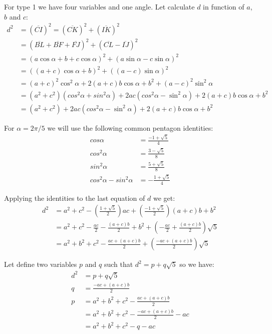 \documentclass[11pt]{article}
\begin{document}
For type 1 we have four variables and one angle. Let calculate $d$ in function of $a$, $b$ and $c$:
\begin{align}
d^2 &= (\overline{CI})^2 = (\overline{CK})^2 + (\overline{IK})^2\\
    &= (\overline{BL} + \overline{BF} + \overline{FJ})^2 + (\overline{CL} - \overline{IJ})^2 \nonumber\\
    &= (a\cos{\alpha} + b + c\cos{\alpha})^2 + (a\sin{\alpha} - c\sin{\alpha})^2 \nonumber\\
    &= ((a+c)\cos{\alpha} + b)^2 + ((a-c)\sin{\alpha})^2 \nonumber\\
    &= (a+c)^2\cos^2{\alpha} + 2(a+c)b\cos{\alpha} + b^2 + (a-c)^2\sin^2{\alpha} \nonumber\\
    &= (a^2+c^2)(cos^2{\alpha}+sin^2{\alpha}) + 2ac(cos^2{\alpha}-\sin^2{\alpha})+ 2(a+c)b\cos{\alpha} + b^2 \nonumber\\
    &= (a^2+c^2) + 2ac(cos^2{\alpha}-\sin^2{\alpha})+ 2(a+c)b\cos{\alpha} + b^2
\end{align}

For $\alpha = 2\pi / 5$ we will use the following common pentagon identities:
\begin{align}
cos{\alpha}   &= \frac{-1 + \sqrt{5}}{4} \\
cos^2{\alpha} &= \frac{{ 3 - \sqrt{5}}}{8} \\
sin^2{\alpha} &= \frac{5 + \sqrt{5}}{8} \\
cos^2{\alpha} - sin^2{\alpha} &= -\frac{1 + \sqrt{5}}{4}
\end{align}

Applying the identities to the last equation of $d$ we get:
\begin{align}
d^2 &= a^2 + c^2 - \left(\frac{1 + \sqrt{5}}{2}\right)ac + \left(\frac{-1 + \sqrt{5}}{2}\right)(a+c)b + b^2 \nonumber\\
    &= a^2 + c^2 - \frac{ac}{2} - \frac{(a+c)b}{2} + b^2 + \left(- \frac{ac}{2} + \frac{(a+c)b}{2}\right)\sqrt{5} \nonumber\\
    &= a^2 + b^2 + c^2 - \frac{ac + (a+c)b}{2} + \left(\frac{-ac + (a+c)b}{2}\right)\sqrt{5}
\end{align}

Let define two variables $p$ and $q$ such that $d^2 = p + q\sqrt{5}$ so we have:
\begin{align*}
d^2 &= p + q\sqrt{5}\\
  q &= \frac{-ac + (a + c)b}{2}\\
  p &= a^2 + b^2 + c^2 - \frac{ac + (a+c)b}{2}\\
    &= a^2 + b^2 + c^2 - \frac{-ac + (a+c)b}{2} - ac\\
    &= a^2 + b^2 + c^2 - q - ac
\end{align*}
\end{document}

